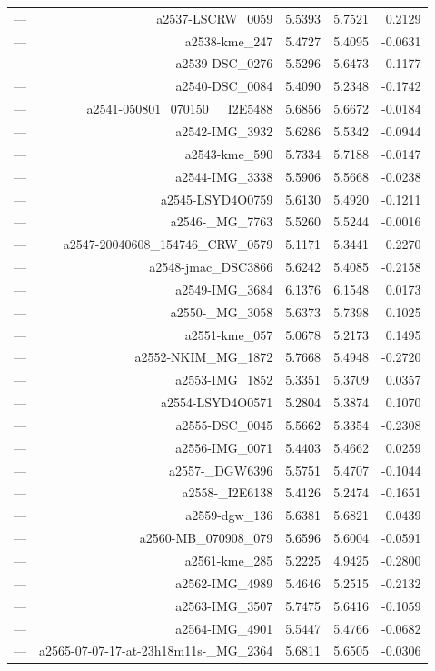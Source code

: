 \begin{table}[htbp]
\begin{tabular}{lrrrr}
— & a2537-LSCRW_0059 & 5.5393 & 5.7521 & 0.2129 \\
— & a2538-kme_247 & 5.4727 & 5.4095 & -0.0631 \\
— & a2539-DSC_0276 & 5.5296 & 5.6473 & 0.1177 \\
— & a2540-DSC_0084 & 5.4090 & 5.2348 & -0.1742 \\
— & a2541-050801_070150__I2E5488 & 5.6856 & 5.6672 & -0.0184 \\
— & a2542-IMG_3932 & 5.6286 & 5.5342 & -0.0944 \\
— & a2543-kme_590 & 5.7334 & 5.7188 & -0.0147 \\
— & a2544-IMG_3338 & 5.5906 & 5.5668 & -0.0238 \\
— & a2545-LSYD4O0759 & 5.6130 & 5.4920 & -0.1211 \\
— & a2546-_MG_7763 & 5.5260 & 5.5244 & -0.0016 \\
— & a2547-20040608_154746_CRW_0579 & 5.1171 & 5.3441 & 0.2270 \\
— & a2548-jmac_DSC3866 & 5.6242 & 5.4085 & -0.2158 \\
— & a2549-IMG_3684 & 6.1376 & 6.1548 & 0.0173 \\
— & a2550-_MG_3058 & 5.6373 & 5.7398 & 0.1025 \\
— & a2551-kme_057 & 5.0678 & 5.2173 & 0.1495 \\
— & a2552-NKIM_MG_1872 & 5.7668 & 5.4948 & -0.2720 \\
— & a2553-IMG_1852 & 5.3351 & 5.3709 & 0.0357 \\
— & a2554-LSYD4O0571 & 5.2804 & 5.3874 & 0.1070 \\
— & a2555-DSC_0045 & 5.5662 & 5.3354 & -0.2308 \\
— & a2556-IMG_0071 & 5.4403 & 5.4662 & 0.0259 \\
— & a2557-_DGW6396 & 5.5751 & 5.4707 & -0.1044 \\
— & a2558-_I2E6138 & 5.4126 & 5.2474 & -0.1651 \\
— & a2559-dgw_136 & 5.6381 & 5.6821 & 0.0439 \\
— & a2560-MB_070908_079 & 5.6596 & 5.6004 & -0.0591 \\
— & a2561-kme_285 & 5.2225 & 4.9425 & -0.2800 \\
— & a2562-IMG_4989 & 5.4646 & 5.2515 & -0.2132 \\
— & a2563-IMG_3507 & 5.7475 & 5.6416 & -0.1059 \\
— & a2564-IMG_4901 & 5.5447 & 5.4766 & -0.0682 \\
— & a2565-07-07-17-at-23h18m11s-_MG_2364 & 5.6811 & 5.6505 & -0.0306 \\

\end{tabular}
\end{table}
